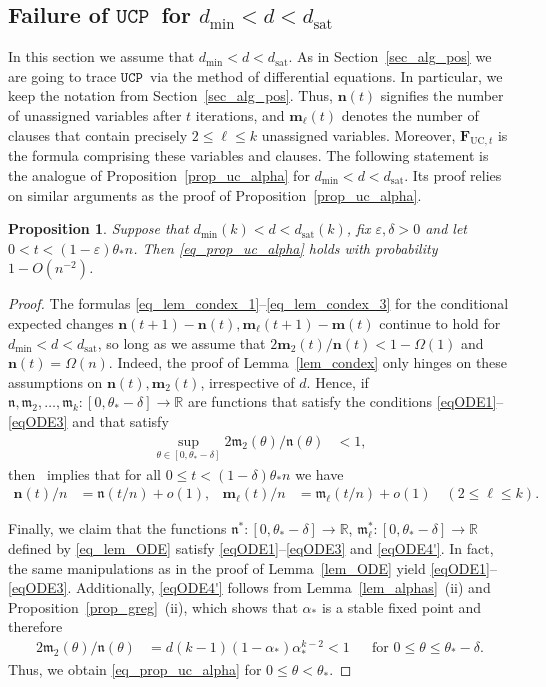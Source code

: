 \documentclass[10pt,reqno]{amsart}
\newcommand\mk[1]{\textcolor{cyan}{#1}}
\renewcommand\mk[1]{#1}
\numberwithin{equation}{section}
\renewcommand{\vec}[1]{\boldsymbol{#1}}
\newcommand\dmin{d_{\mathrm{min}}}
\newcommand\dsat{d_{\mathrm{sat}}}
\newcommand{\FUC}[1]{\PHI_{\mathrm{UC},{#1}}}
\newcommand{\UCP}{\ensuremath{\mathtt{UCP}}}
\newcommand\PHI{\vec F}
\newcommand\fm{\mathfrak m}
\newcommand\fn{\mathfrak n}
\newcommand\vm{\vec m}
\newcommand\vn{\vec n}
\newcommand\eps{\varepsilon}
\newcommand\RR{\mathbb{R}}
\newcommand\Lem{Lemma}
\newcommand\Prop{Proposition}
\newcommand\Thm{Theorem}
\newcommand\Sec{Section}
\newtheorem{proposition}[definition]{Proposition}
\begin{document}
\subsection{Failure of \UCP\ for $\dmin<d<\dsat$}\label{sec_failure}
In this section we assume that $\dmin<d<\dsat$.
As in \Sec~\ref{sec_alg_pos} we are going to trace \UCP\ via the method of differential equations.
In particular, we keep the notation from \Sec~\ref{sec_alg_pos}.
Thus, $\vn(t)$ signifies the number of unassigned variables after $t$ iterations, and $\vm_\ell(t)$ denotes the number of clauses that contain precisely $2\leq\ell\leq k$ unassigned variables.
Moreover, $\FUC t$ is the formula comprising these variables and clauses.
The following statement is the analogue of \Prop~\ref{prop_uc_alpha} for $\dmin<d<\dsat$.
Its proof relies on similar arguments as the proof of \Prop~\ref{prop_uc_alpha}.

\begin{proposition}\label{prop_bpgd_cond}
	Suppose that $\dmin(k)<d<\dsat(k)$, fix $\eps,\delta>0$ and let $0<t<(1-\eps)\theta_*n$.
	Then \eqref{eq_prop_uc_alpha} holds with probability $1-O(n^{-2})$.
\end{proposition}
\begin{proof}
The formulas \eqref{eq_lem_condex_1}--\eqref{eq_lem_condex_3} for the conditional expected changes $\vn(t+1)-\vn(t),\vm_\ell(t+1)-\vm(t)$ continue to hold for $\dmin<d<\dsat$, so long as we assume that $2\vm_2(t)/\vn(t)<1-\Omega(1)$ and $\vn(t)=\Omega(n)$.
Indeed, the proof of \Lem~\ref{lem_condex} only hinges on these assumptions on $\vn(t),\vm_2(t)$, irrespective of $d$.
Hence, if $\fn,\fm_2,\ldots,\fm_k:[0,\theta_*-\delta] \mk{\to \mathbb{R}}$ are functions that satisfy the conditions \eqref{eqODE1}--\eqref{eqODE3} and that satisfy
\begin{align}\label{eqODE4'}
	\sup_{\theta\in[0,\theta_*-\delta]}2\fm_2(\theta)/\fn(\theta)&<1,
\end{align}
then~\cite[\Thm~2]{Wormald} implies that for all $0\leq t<(1-\delta)\theta_*n$ we have
\begin{align*}
	\vn(t)/n&=\fn(t/n)+o(1),& \vm_\ell(t)/n&=\fm_\ell(t/n)+o(1)\quad(2\leq\ell\leq k).
\end{align*}

Finally, we claim that the functions $\fn^*:[0,\theta_*-\delta]\to\RR$, $\fm_\ell^*:[0,\theta_*-\delta]\to\RR$ defined by \eqref{eq_lem_ODE} satisfy \eqref{eqODE1}--\eqref{eqODE3}  and \eqref{eqODE4'}.
In fact, the same manipulations as in the proof of \Lem~\ref{lem_ODE} yield \eqref{eqODE1}--\eqref{eqODE3}.
Additionally, \eqref{eqODE4'} follows from \Lem~\ref{lem_alphas}~(ii) and \Prop~\ref{prop_greg}~(ii), which shows that $\alpha_*$ is a stable fixed point and therefore 
\begin{align*}
	2\fm_2(\theta)/\fn(\theta)&=d(k-1)(1-\alpha_*)  \alpha_*^{k-2}<1 &&\mbox{for }0\leq\theta\leq\theta_*-\delta.
\end{align*}
Thus, we obtain \eqref{eq_prop_uc_alpha} for $0\leq \theta<\theta_*$.
\end{proof}
\end{document}

